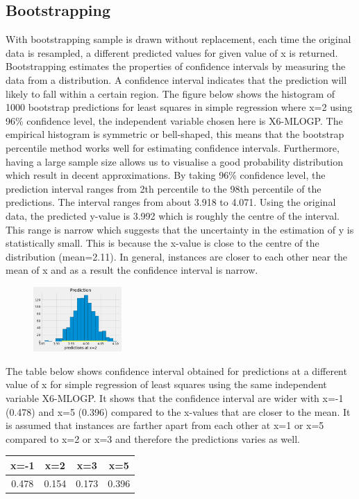 \documentclass{ueacmpstyle}
\begin{document}
	    \subsection{Bootstrapping}\label{sec:bootstrapping}
	    
	    With bootstrapping sample is drawn without replacement, each time the original data is resampled, a different predicted values for given value of x is returned. Bootstrapping estimates the properties of confidence intervals by measuring the data from a distribution. A confidence interval indicates that the prediction will likely to fall within a certain region. The figure below shows the histogram of 1000 bootstrap predictions for least squares in simple regression where x=2 using 96\% confidence level, the independent variable chosen here is X6-MLOGP. The empirical histogram is symmetric or bell-shaped, this means that the bootstrap percentile method works well for estimating confidence intervals. Furthermore, having a large sample size allows us to visualise a good probability distribution which result in decent approximations. By taking 96\% confidence level, the prediction interval ranges from 2th percentile to the 98th percentile of the predictions. The interval ranges from about 3.918 to 4.071. Using the original data, the predicted y-value is 3.992 which is roughly the centre of the interval. This range is narrow which suggests that the uncertainty in the estimation of y is statistically small. This is because the x-value is close to the centre of the distribution (mean=2.11). In general, instances are closer to each other near the mean of x and as a result the confidence interval is narrow.
	    
	    \begin{figure}[!htb]
	    		\centering
	    		\includegraphics[width=0.3\textwidth]{hist_simple_1.png}	
	    		\label{fig5}
	    \end{figure}
    
	    The table below shows confidence interval obtained for predictions at a different value of x for simple regression of least squares using the same independent variable X6-MLOGP. It shows that the confidence interval are wider with x=-1 (0.478) and x=5 (0.396) compared to the x-values that are closer to the mean. It is assumed that instances are farther apart from each other at x=1 or x=5 compared to x=2 or x=3 and therefore the predictions varies as well.
    	\begin{center}
    	\begin{tabular}{||c c c c||} 
    		\hline
    		x=-1 & x=2 & x=3 & x=5 \\ [0.5ex] 
    		\hline\hline
    		0.478 & 0.154 & 0.173 & 0.396 \\ 
    		\hline
    	\end{tabular}
    	\end{center}
    
\end{document}
